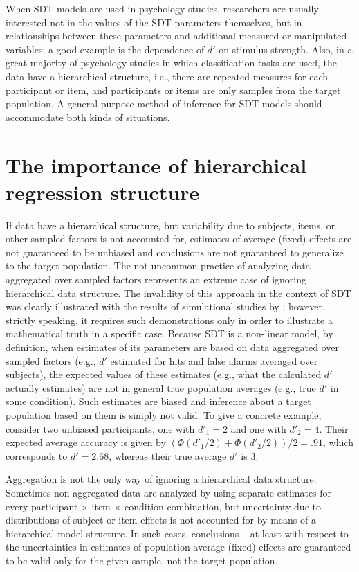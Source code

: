 \documentclass[a4paper,man,apacite,floatsintext]{apa6}
\begin{document}
When SDT models are used in psychology studies, researchers are
usually interested not in the values of the SDT parameters themselves,
but in relationships between these parameters and additional measured
or manipulated variables; a good example is the dependence of $d'$ on
stimulus strength. Also, in a great majority of psychology studies in
which classification tasks are used, the data have a hierarchical
structure, i.e., there are repeated measures for each participant or
item, and participants or items are only samples from the target
population. A general-purpose method of inference for SDT models
should accommodate both kinds of situations.

\section{The importance of hierarchical regression structure}

If data have a hierarchical structure, but variability due to
subjects, items, or other sampled factors is not accounted for,
estimates of average (fixed) effects are not guaranteed to be unbiased
and conclusions are not guaranteed to generalize to the target
population. The not uncommon practice of analyzing data aggregated
over sampled factors represents an extreme case of ignoring
hierarchical data structure. The invalidity of this approach in the
context of SDT was clearly illustrated with the results of
simulational studies by ; however,
strictly speaking, it requires such demonstrations only in order to
illustrate a mathematical truth in a specific case. Because SDT is a
non-linear model, by definition, when estimates of its parameters are
based on data aggregated over sampled factors (e.g., $d'$ estimated
for hits and false alarms averaged over subjects), the expected values
of these estimates (e.g., what the calculated $d'$ actually estimates)
are not in general true population averages (e.g., true $d'$ in some
condition). Such estimates are biased and inference about a target
population based on them is simply not valid. To give a concrete
example, consider two unbiased participants, one with $d'_1 = 2$ and
one with $d'_2 = 4$. Their expected average accuracy is given by
$(\Phi(d'_1/2) + \Phi(d'_2/2)) / 2 = .91$, which corresponds to
$d' = 2.68$, whereas their true average $d'$ is $3$.

Aggregation is not the only way of ignoring a hierarchical data
structure. Sometimes non-aggregated data are analyzed by using
separate estimates for every participant $\times$ item $\times$
condition combination, but uncertainty due to distributions of subject
or item effects is not accounted for by means of a hierarchical model
structure. In such cases, conclusions -- at least with respect to the
uncertainties in estimates of population-average (fixed) effects are
guaranteed to be valid only for the given sample, not the target
population.
\end{document}
